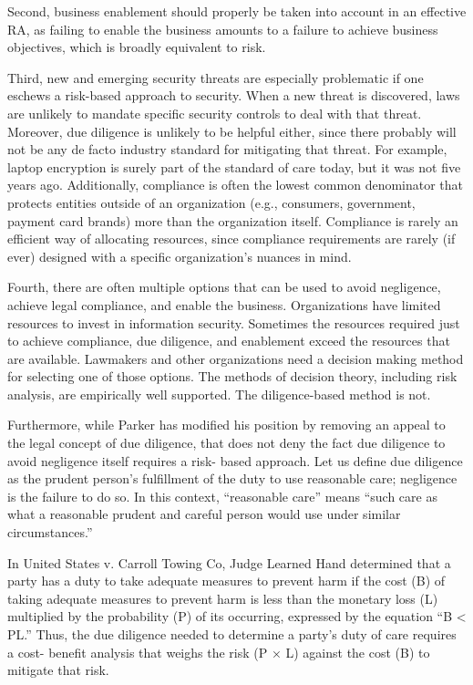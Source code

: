 Second, business enablement should properly be taken into account in an
effective RA, as failing to enable the business amounts to a failure to
achieve business objectives, which is broadly equivalent to risk.

Third, new and emerging security threats are especially problematic if
one eschews a risk-based approach to security. When a new threat is
discovered, laws are unlikely to mandate specific security controls to
deal with that threat. Moreover, due diligence is unlikely to be helpful
either, since there probably will not be any de facto industry standard
for mitigating that threat. For example, laptop encryption is surely
part of the standard of care today, but it was not five years ago.
Additionally, compliance is often the lowest common denominator that
protects entities outside of an organization (e.g., consumers,
government, payment card brands) more than the organization itself.
Compliance is rarely an efficient way of allocating resources, since
compliance requirements are rarely (if ever) designed with a specific
organization's nuances in mind.

Fourth, there are often multiple options that can be used to avoid
negligence, achieve legal compliance, and enable the business.
Organizations have limited resources to invest in information security.
Sometimes the resources required just to achieve compliance, due
diligence, and enablement exceed the resources that are available.
Lawmakers and other organizations need a decision making method for
selecting one of those options. The methods of decision theory,
including risk analysis, are empirically well supported. The
diligence-based method is not.

Furthermore, while Parker has modified his position by removing an
appeal to the legal concept of due diligence, that does not deny the
fact due diligence to avoid negligence itself requires a risk- based
approach. Let us define due diligence as the prudent person's
fulfillment of the duty to use reasonable care; negligence is the
failure to do so. In this context, ``reasonable care'' means ``such care
as what a reasonable prudent and careful person would use under similar
circumstances.''

In United States v. Carroll Towing Co, Judge Learned Hand determined
that a party has a duty to take adequate measures to prevent harm if the
cost (B) of taking adequate measures to prevent harm is less than the
monetary loss (L) multiplied by the probability (P) of its occurring,
expressed by the equation ``B \textless{} PL.'' Thus, the due diligence
needed to determine a party's duty of care requires a cost- benefit
analysis that weighs the risk (P × L) against the cost (B) to mitigate
that risk.

